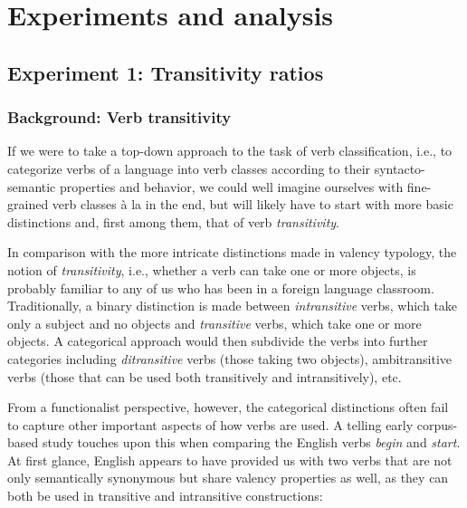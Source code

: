 \chapter{Experiments and analysis}
\section{Experiment 1: Transitivity ratios}\label{sec:exp1}
\subsection{Background: Verb transitivity}
If we were to take a top-down approach to the task of verb classification, i.e., to categorize verbs of a language into verb classes according to their syntacto-semantic properties and behavior, we could well imagine ourselves with fine-grained verb classes à la \citet{levin1993} in the end, but will likely have to start with more basic distinctions and, first among them, that of verb \textit{transitivity}. 

In comparison with the more intricate distinctions made in valency typology, the notion of \textit{transitivity}, i.e., whether a verb can take one or more objects, is probably familiar to any of us who has been in a foreign language classroom. Traditionally, a binary distinction is made between \textit{intransitive} verbs, which take only a subject and no objects and \textit{transitive} verbs, which take one or more objects. A categorical approach would then subdivide the verbs into further categories including \textit{ditransitive} verbs (those taking two objects), ambitransitive verbs (those that can be used both transitively and intransitively), etc.


From a functionalist perspective, however, the categorical distinctions often fail to capture other important aspects of how verbs are used. A telling early corpus-based study \citep{biber1998} touches upon this when comparing the English verbs \textit{begin} and \textit{start}. At first glance, English appears to have provided us with two verbs that are not only semantically synonymous but share valency properties as well, as they can both be used in transitive and intransitive constructions:

\begin{exe}
\ex\label{example-begin_start}
  \begin{xlist}
  \end{xlist}
\end{exe}

